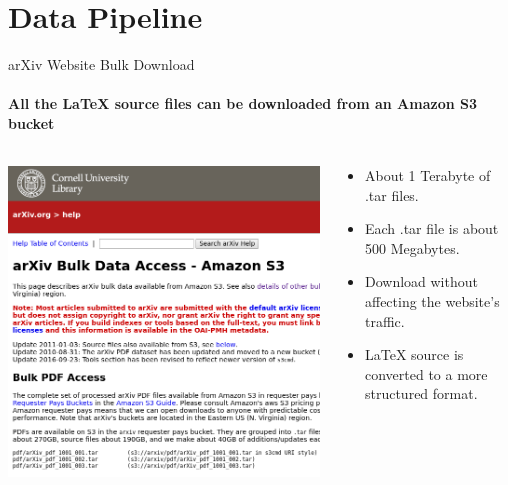 \documentclass[10pt]{beamer}
\begin{document}
\section{Data Pipeline}
\begin{frame}{arXiv Website Bulk Download}
    \framesubtitle{All the \LaTeX{} source files can be downloaded from an Amazon S3 bucket}
    \begin{columns}[T]
        \begin{column}{0.5\textwidth}
    \includegraphics[width=\textwidth]{bulk_download.png} 
        \end{column}
        \begin{column}{0.6\textwidth}
            \begin{itemize}
                \item About 1 Terabyte of .tar files.
                \item Each .tar file is about 500 Megabytes.
                \item Download without affecting the website's traffic.
                \item \LaTeX{} source is converted to a more structured format.
            \end{itemize}
        \end{column}
    \end{columns}
\end{frame}
\end{document}
